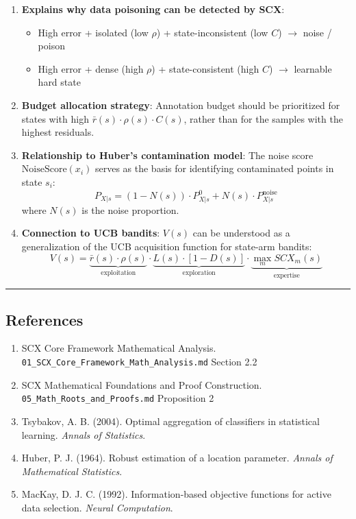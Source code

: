 \documentclass[
  12pt,
]{article}
\providecommand{\tightlist}{%
  \setlength{\itemsep}{0pt}\setlength{\parskip}{0pt}}
\begin{document}
\begin{enumerate}
\def\labelenumi{\arabic{enumi}.}
\item
  \textbf{Explains why data poisoning can be detected by SCX}:

  \begin{itemize}
  \tightlist
  \item
    High error + isolated (low \(\rho\)) + state-inconsistent (low \(C\)) \(\to\) noise / poison
  \item
    High error + dense (high \(\rho\)) + state-consistent (high \(C\)) \(\to\) learnable hard
    state
  \end{itemize}
\item
  \textbf{Budget allocation strategy}: Annotation budget should be prioritized for
  states with high \(\bar{r}(s) \cdot \rho(s) \cdot C(s)\), rather than for the samples with the highest residuals.
\item
  \textbf{Relationship to Huber's contamination model}: The noise score \(\text{NoiseScore}(x_i)\)
  serves as the basis for identifying contaminated points in state \(s_i\):
  \[P_{X|s} = (1 - N(s)) \cdot P_{X|s}^0 + N(s) \cdot P_{X|s}^{\text{noise}}\]
  where \(N(s)\) is the noise proportion.
\item
  \textbf{Connection to UCB bandits}: \(V(s)\) can be understood as a generalization of the UCB
  acquisition function for state-arm bandits:
  \[V(s) = \underbrace{\bar{r}(s) \cdot \rho(s)}_{\text{exploitation}} \cdot \underbrace{L(s) \cdot [1-D(s)]}_{\text{exploration}} \cdot \underbrace{\max_m SCX_m(s)}_{\text{expertise}}\]
\end{enumerate}

\begin{center}\rule{0.5\linewidth}{0.5pt}\end{center}

\subsection{References}\label{references}

\begin{enumerate}
\def\labelenumi{\arabic{enumi}.}
\tightlist
\item
  SCX Core Framework Mathematical Analysis. \texttt{01\_SCX\_Core\_Framework\_Math\_Analysis.md} Section
  2.2
\item
  SCX Mathematical Foundations and Proof Construction. \texttt{05\_Math\_Roots\_and\_Proofs.md} Proposition 2
\item
  Tsybakov, A. B. (2004). Optimal aggregation of classifiers in
  statistical learning. \emph{Annals of Statistics}.
\item
  Huber, P. J. (1964). Robust estimation of a location parameter.
  \emph{Annals of Mathematical Statistics}.
\item
  MacKay, D. J. C. (1992). Information-based objective functions for
  active data selection. \emph{Neural Computation}.
\end{enumerate}
\end{document}
